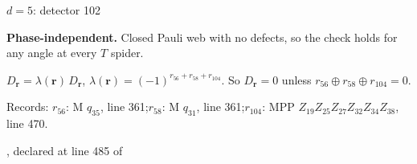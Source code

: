 \label{d5_det102}
{\Large $d=5$: detector 102}\par
\textbf{Phase-independent.} Closed Pauli web with no defects, so the check holds for any angle at every $T$ spider.
\begin{center}
\end{center}
\vspace{-1mm}
$D_{\boldsymbol r}=\lambda(\boldsymbol r)\,D_{\boldsymbol r}$, \quad $\lambda(\boldsymbol r)=(-1)^{r_{56}+r_{58}+r_{104}}$. \qquad So $D_{\boldsymbol r}=0$ unless $r_{56}\oplus r_{58}\oplus r_{104}=0$.
\par\smallskip\begin{minipage}{.98\linewidth}\small Records: $r_{56}$: M $q_{35}$, line 361;\quad $r_{58}$: M $q_{31}$, line 361;\quad $r_{104}$: MPP $Z_{19}Z_{25}Z_{27}Z_{32}Z_{34}Z_{38}$, line 470.\end{minipage}
\vfill
{\footnotesize\texttt{}, declared at line 485 of \texttt{}}
\newpage

